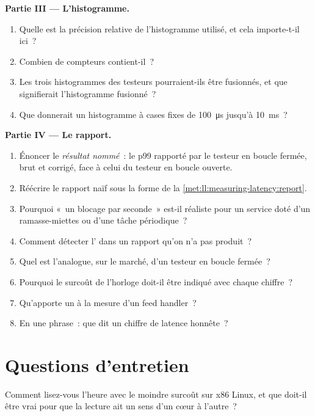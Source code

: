 \begin{problem}
\medskip\noindent\textbf{Partie III --- L'histogramme.}
\begin{enumerate}[resume]
\item Quelle est la précision relative de l'histogramme utilisé, et cela importe-t-il ici~?
\item Combien de compteurs contient-il~?
\item Les trois histogrammes des testeurs pourraient-ils être fusionnés, et que signifierait l'histogramme fusionné~?
\item Que donnerait un histogramme à cases fixes de \qty{100}{\micro\second} jusqu'à \qty{10}{\milli\second}~?
\end{enumerate}

\medskip\noindent\textbf{Partie IV --- Le rapport.}
\begin{enumerate}[resume]
\item Énoncer le \emph{résultat nommé}~: le p99 rapporté par le testeur en boucle fermée, brut et corrigé, face à celui du
testeur en boucle ouverte.
\item Réécrire le rapport naïf sous la forme de la \cref{met:ll:measuring-latency:report}.
\item Pourquoi «~un blocage par seconde~» est-il réaliste pour un service doté d'un ramasse-miettes ou d'une tâche périodique~?
\item Comment détecter l' dans un rapport qu'on n'a pas produit~?
\item Quel est l'analogue, sur le marché, d'un testeur en boucle fermée~?
\item Pourquoi le surcoût de l'horloge doit-il être indiqué avec chaque chiffre~?
\item Qu'apporte un  à la mesure d'un feed handler~?
\item En une phrase~: que dit un chiffre de latence honnête~?
\end{enumerate}
\end{problem}

\section{Questions d'entretien}

\begin{interviewq}\label{iq:ll:measuring-latency:1}
Comment lisez-vous l'heure avec le moindre surcoût sur x86 Linux, et que doit-il être vrai pour que la lecture ait un sens
d'un cœur à l'autre~?
\end{interviewq}

